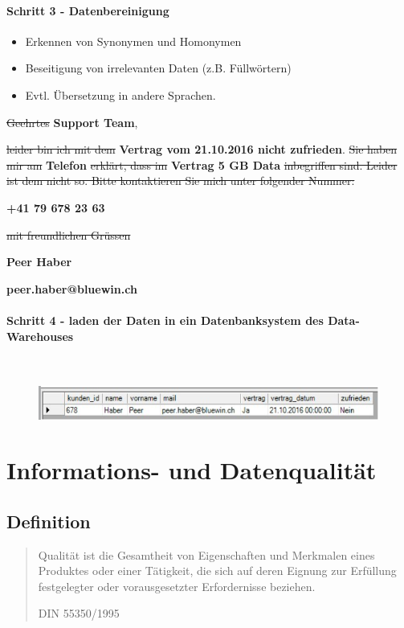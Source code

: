\documentclass[a4paper, 11pt]{article}
\begin{document}
\paragraph{Schritt 3 - Datenbereinigung}
\begin{itemize}
	\item Erkennen von Synonymen und Homonymen
	\item Beseitigung von irrelevanten Daten (z.B. Füllwörtern)
	\item Evtl. Übersetzung in andere Sprachen.
\end{itemize}

\noindent \sout{Geehrtes} \textbf{Support Team},

\noindent \sout{leider bin ich mit dem} \textbf{Vertrag vom 21.10.2016 nicht zufrieden}. \sout{Sie
haben mir am} \textbf{Telefon}\sout{ erklärt, dass im} \textbf{ Vertrag 5 GB Data} \sout{inbegriffen
sind. Leider ist dem nicht so. Bitte kontaktieren Sie mich unter folgender Nummer:}

\noindent \textbf{+41 79 678 23 63}

\noindent \sout{mit freundlichen Grüssen}

\noindent \textbf{Peer Haber}

\noindent \textbf{peer.haber@bluewin.ch}

\paragraph{Schritt 4 - laden der Daten in ein Datenbanksystem des Data-Warehouses}\mbox{} \\

\begin{figure}[htb]
	\centering
	\includegraphics[keepaspectratio=true,height=3.5\baselineskip]{haber_peer.PNG}
\end{figure}

\section{Informations- und Datenqualität}
\subsection{Definition}
\blockquote[DIN 55350/1995]{Qualität ist die Gesamtheit von Eigenschaften und Merkmalen eines Produktes oder einer Tätigkeit, die sich auf deren Eignung zur Erfüllung festgelegter oder vorausgesetzter Erfordernisse beziehen.}
\vspace{10px}
\end{document}
